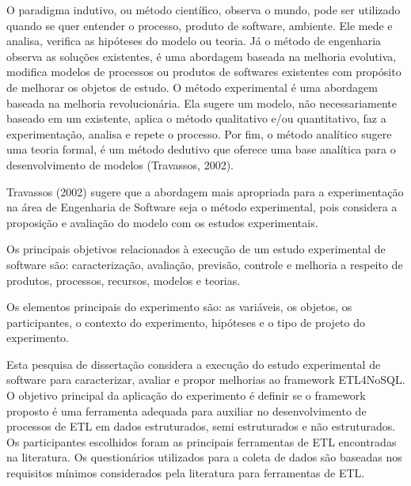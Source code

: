 O paradigma indutivo, ou método científico, observa o mundo, pode ser utilizado quando se quer entender o processo, produto de software, ambiente. Ele mede e analisa, verifica as hipóteses do modelo ou teoria.  Já o método de engenharia observa as soluções existentes, é uma abordagem baseada na melhoria evolutiva, modifica modelos de processos ou produtos de softwares existentes com propósito de melhorar os objetos de estudo. O método experimental é uma abordagem baseada na melhoria revolucionária. Ela sugere um modelo, não necessariamente baseado em um existente, aplica o método qualitativo e/ou quantitativo, faz a experimentação, analisa e repete o processo. Por fim, o método analítico sugere uma teoria formal, é um método dedutivo que oferece uma base analítica para o desenvolvimento de modelos (Travassos, 2002).

Travassos (2002) sugere que a abordagem mais apropriada para a experimentação na área de Engenharia de Software seja o método experimental, pois considera a proposição e avaliação do modelo com os estudos experimentais.

Os principais objetivos relacionados à execução de um estudo experimental de software são: caracterização, avaliação, previsão, controle e melhoria a respeito de produtos, processos, recursos, modelos e teorias.

Os elementos principais do experimento são: as variáveis, os objetos, os participantes, o contexto do experimento, hipóteses e o tipo de projeto do experimento.

Esta pesquisa de dissertação considera a execução do estudo experimental de software para caracterizar, avaliar e propor melhorias ao framework ETL4NoSQL. O objetivo principal da aplicação do experimento é definir se o framework proposto é uma ferramenta adequada para auxiliar no desenvolvimento de processos de ETL em dados estruturados, semi estruturados e não estruturados. Os participantes escolhidos foram as principais ferramentas de ETL encontradas na literatura. Os questionários utilizados para a coleta de dados são baseadas nos requisitos mínimos considerados pela literatura para ferramentas de ETL.


